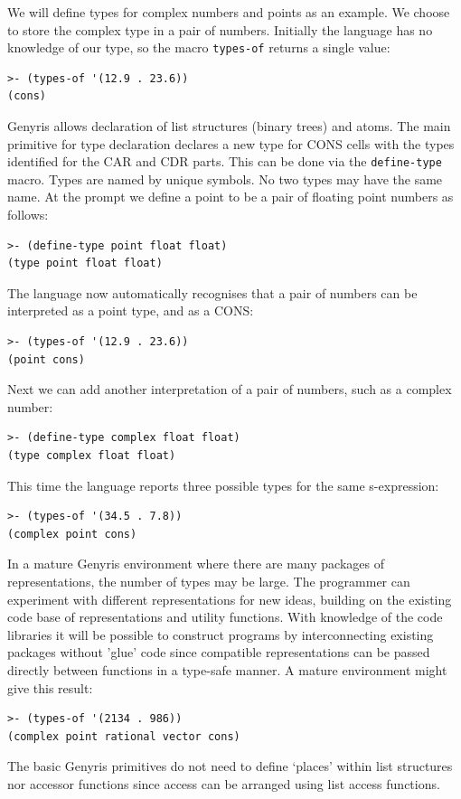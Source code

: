 \documentclass[a4paper,12pt,dvips]{article}
\begin{document}
We will define types for complex numbers and points as an example. We choose to store the complex type in a pair of numbers. Initially the language has no knowledge of our type, so the macro \texttt{types-of} returns a single value:
\begin{verbatim}
>- (types-of '(12.9 . 23.6))
(cons)
\end{verbatim}
Genyris allows declaration of list structures (binary trees) and atoms. The main primitive for type declaration declares a new type for CONS cells with the types identified for the CAR and CDR parts. This can be done via the \texttt{define-type} macro. Types are named by unique symbols. No two types may have the same name. At the prompt we define a point to be a pair of floating point numbers as follows:
\begin{verbatim}
>- (define-type point float float)
(type point float float)
\end{verbatim}
The language now automatically recognises that a pair of numbers can be interpreted as a point type, and as a CONS:
\begin{verbatim}
>- (types-of '(12.9 . 23.6))
(point cons)
\end{verbatim}
 Next we can add another interpretation of a pair of numbers, such as a complex number:
\begin{verbatim}
>- (define-type complex float float)
(type complex float float)
\end{verbatim}
This time the language reports three possible types for the same s-expression:
\begin{verbatim}
>- (types-of '(34.5 . 7.8))
(complex point cons)
\end{verbatim}
In a mature Genyris environment where there are many packages of representations, the number of types may be large. The programmer can experiment with different representations for new ideas, building on the existing code base of representations and utility functions. With knowledge of the code libraries it will be possible to construct programs by interconnecting existing packages without 'glue' code since compatible representations can be passed directly between functions in a type-safe manner. A mature environment might give this result:
\begin{verbatim}
>- (types-of '(2134 . 986))
(complex point rational vector cons)
\end{verbatim}

The basic Genyris primitives do not need to define `places' within list structures nor accessor functions since access can be arranged using list access functions. 
\end{document}
